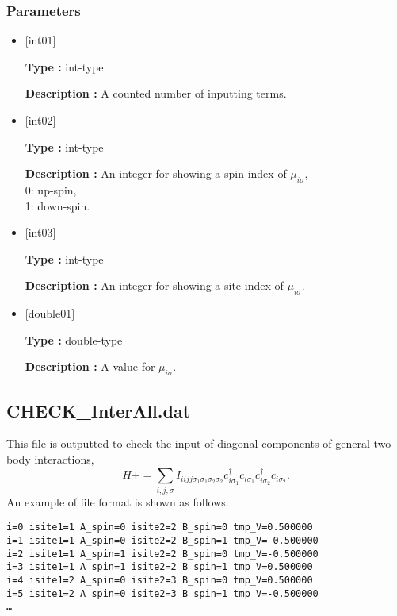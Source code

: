 \subsubsection{Parameters}
 \begin{itemize}

   \item  $[$int01$]$ 
   
    {\bf Type :} int-type

   {\bf Description :} A counted number of inputting terms.
   
   \item  $[$int02$]$ 
   
    {\bf Type :} int-type

   {\bf Description :}  An integer for showing a spin index of $\mu_{i\sigma}$,\\
0: up-spin,\\
1: down-spin.
   
   \item  $[$int03$]$ 
   
    {\bf Type :} int-type

    {\bf Description :}  An integer for showing a site index of $\mu_{i\sigma}$.
 
   \item  $[$double01$]$ 
   
    {\bf Type :} double-type

   {\bf Description :} A value for $\mu_{i\sigma}$.
     
\end{itemize}

\subsection{CHECK\_InterAll.dat}
This file is outputted to check the input of diagonal components of general two body interactions,
\begin{equation}
H+=\sum_{i,j, \sigma} I_{iijj\sigma_1\sigma_1\sigma_2\sigma_2} c_{i\sigma_1}^{\dagger}c_{i\sigma_1}c_{i\sigma_2}^{\dagger}c_{i\sigma_2}.
\end{equation}
An example of file format is shown as follows.

\begin{minipage}{12.5cm}
\begin{screen}
\begin{verbatim}
i=0 isite1=1 A_spin=0 isite2=2 B_spin=0 tmp_V=0.500000 
i=1 isite1=1 A_spin=0 isite2=2 B_spin=1 tmp_V=-0.500000 
i=2 isite1=1 A_spin=1 isite2=2 B_spin=0 tmp_V=-0.500000 
i=3 isite1=1 A_spin=1 isite2=2 B_spin=1 tmp_V=0.500000 
i=4 isite1=2 A_spin=0 isite2=3 B_spin=0 tmp_V=0.500000 
i=5 isite1=2 A_spin=0 isite2=3 B_spin=1 tmp_V=-0.500000 
…
\end{verbatim}
\end{screen}
\end{minipage}

